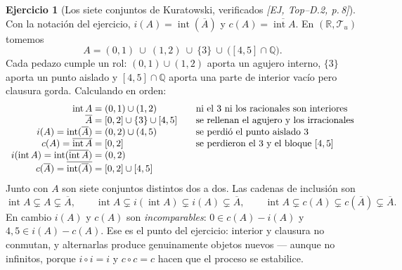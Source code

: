 \documentclass[11pt,a4paper]{article}
\theoremstyle{definition}
\newtheorem{ejercicio}[definicion]{Ejercicio}
\theoremstyle{plain}
\newcommand{\fnt}[1]{{\normalfont\small\itshape\color{gray!150!black}[#1]}}
\newcommand{\R}{\mathbb{R}}
\newcommand{\Q}{\mathbb{Q}}
\newcommand{\cl}[1]{\overline{#1}}
\newcommand{\intr}{\operatorname{int}}
\newcommand{\tp}{\mathcal{T}}
\begin{document}
\begin{ejercicio}[Los siete conjuntos de Kuratowski, verificados \fnt{EJ, Top--D.2, p.\,8}]\label{ej:kur}
Con la notación del ejercicio, $i(A)=\intr(\cl A)$ y $c(A)=\cl{\intr A}$. En $(\R,\tp_u)$ tomemos
\[
A=(0,1)\ \cup\ (1,2)\ \cup\ \{3\}\ \cup\ \big([4,5]\cap\Q\big).
\]
Cada pedazo cumple un rol: $(0,1)\cup(1,2)$ aporta un agujero interno, $\{3\}$ aporta un punto aislado y $[4,5]\cap\Q$ aporta una parte de interior vacío pero clausura gorda. Calculando en orden:
\[
\begin{array}{r@{\;=\;}l@{\qquad}l}
\intr A & (0,1)\cup(1,2) & \text{ni el 3 ni los racionales son interiores}\\
\cl A & [0,2]\cup\{3\}\cup[4,5] & \text{se rellenan el agujero y los irracionales}\\
i(A)=\intr(\cl A) & (0,2)\cup(4,5) & \text{se perdió el punto aislado 3}\\
c(A)=\cl{\intr A} & [0,2] & \text{se perdieron el 3 y el bloque } [4,5]\\
i(\intr A)=\intr(\cl{\intr A}) & (0,2) & \\
c(\cl A)=\cl{\intr(\cl A)} & [0,2]\cup[4,5] &
\end{array}
\]
Junto con $A$ son siete conjuntos distintos dos a dos. Las cadenas de inclusión son
\[
\intr A\subsetneq A\subsetneq\cl A,\qquad
\intr A\subsetneq i(\intr A)\subsetneq i(A)\subsetneq \cl A,\qquad
\intr A\subsetneq c(A)\subsetneq c(\cl A)\subsetneq\cl A .
\]
En cambio $i(A)$ y $c(A)$ son \emph{incomparables}: $0\in c(A)-i(A)$ y $4{,}5\in i(A)-c(A)$. Ese es el punto del ejercicio: interior y clausura no conmutan, y alternarlas produce genuinamente objetos nuevos --- aunque no infinitos, porque $i\circ i=i$ y $c\circ c=c$ hacen que el proceso se estabilice.
\end{ejercicio}
\end{document}
